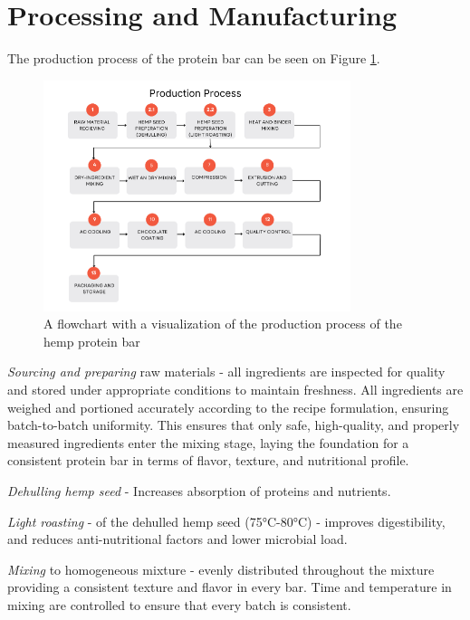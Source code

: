 \section{Processing and Manufacturing}
The production process of the protein bar can be seen on Figure \ref*{fig:figure_07}.
\begin{figure}
    \centering
    \includegraphics[width=0.8\textwidth]{Figures/fig_process_01.png}
    \caption{A flowchart with a visualization of the production process of the hemp protein bar}
    \label{fig:figure_07}
\end{figure}

\textit{Sourcing and preparing} raw materials - all ingredients are inspected for quality and stored under appropriate conditions to maintain freshness. All ingredients are weighed and portioned accurately according to the recipe formulation, ensuring batch-to-batch uniformity. This ensures that only safe, high-quality, and properly measured ingredients enter the mixing stage, laying the foundation for a consistent protein bar in terms of flavor, texture, and nutritional profile.

\vspace{1em}
\textit{Dehulling hemp seed} - Increases absorption of proteins and nutrients.

\vspace{1em}
\textit{Light roasting} - of the dehulled hemp seed (75°C-80°C) - improves digestibility, and reduces anti-nutritional factors and lower microbial load.

\vspace{1em}
\textit{Mixing} to homogeneous mixture - evenly distributed throughout the mixture providing a consistent texture and flavor in every bar. Time and temperature in mixing are controlled to ensure that every batch is consistent.

